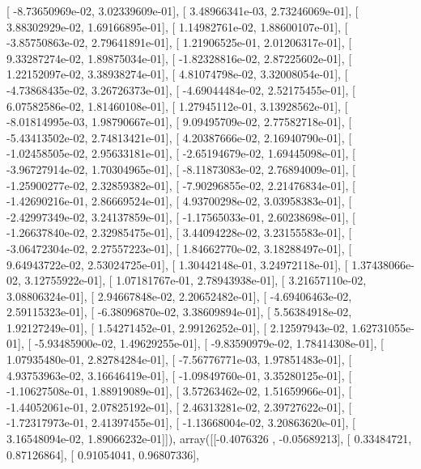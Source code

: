 \documentclass{article}
\begin{document}
       [ -8.73650969e-02,   3.02339609e-01],
       [  3.48966341e-03,   2.73246069e-01],
       [  3.88302929e-02,   1.69166895e-01],
       [  1.14982761e-02,   1.88600107e-01],
       [ -3.85750863e-02,   2.79641891e-01],
       [  1.21906525e-01,   2.01206317e-01],
       [  9.33287274e-02,   1.89875034e-01],
       [ -1.82328816e-02,   2.87225602e-01],
       [  1.22152097e-02,   3.38938274e-01],
       [  4.81074798e-02,   3.32008054e-01],
       [ -4.73868435e-02,   3.26726373e-01],
       [ -4.69044484e-02,   2.52175455e-01],
       [  6.07582586e-02,   1.81460108e-01],
       [  1.27945112e-01,   3.13928562e-01],
       [ -8.01814995e-03,   1.98790667e-01],
       [  9.09495709e-02,   2.77582718e-01],
       [ -5.43413502e-02,   2.74813421e-01],
       [  4.20387666e-02,   2.16940790e-01],
       [ -1.02458505e-02,   2.95633181e-01],
       [ -2.65194679e-02,   1.69445098e-01],
       [ -3.96727914e-02,   1.70304965e-01],
       [ -8.11873083e-02,   2.76894009e-01],
       [ -1.25900277e-02,   2.32859382e-01],
       [ -7.90296855e-02,   2.21476834e-01],
       [ -1.42690216e-01,   2.86669524e-01],
       [  4.93700298e-02,   3.03958383e-01],
       [ -2.42997349e-02,   3.24137859e-01],
       [ -1.17565033e-01,   2.60238698e-01],
       [ -1.26637840e-02,   2.32985475e-01],
       [  3.44094228e-02,   3.23155583e-01],
       [ -3.06472304e-02,   2.27557223e-01],
       [  1.84662770e-02,   3.18288497e-01],
       [  9.64943722e-02,   2.53024725e-01],
       [  1.30442148e-01,   3.24972118e-01],
       [  1.37438066e-02,   3.12755922e-01],
       [  1.07181767e-01,   2.78943938e-01],
       [  3.21657110e-02,   3.08806324e-01],
       [  2.94667848e-02,   2.20652482e-01],
       [ -4.69406463e-02,   2.59115323e-01],
       [ -6.38096870e-02,   3.38609894e-01],
       [  5.56384918e-02,   1.92127249e-01],
       [  1.54271452e-01,   2.99126252e-01],
       [  2.12597943e-02,   1.62731055e-01],
       [ -5.93485900e-02,   1.49629255e-01],
       [ -9.83590979e-02,   1.78414308e-01],
       [  1.07935480e-01,   2.82784284e-01],
       [ -7.56776771e-03,   1.97851483e-01],
       [  4.93753963e-02,   3.16646419e-01],
       [ -1.09849760e-01,   3.35280125e-01],
       [ -1.10627508e-01,   1.88919089e-01],
       [  3.57263462e-02,   1.51659966e-01],
       [ -1.44052061e-01,   2.07825192e-01],
       [  2.46313281e-02,   2.39727622e-01],
       [ -1.72317973e-01,   2.41397455e-01],
       [ -1.13668004e-02,   3.20863620e-01],
       [  3.16548094e-02,   1.89066232e-01]]), array([[-0.4076326 , -0.05689213],
       [ 0.33484721,  0.87126864],
       [ 0.91054041,  0.96807336],
\end{document}
